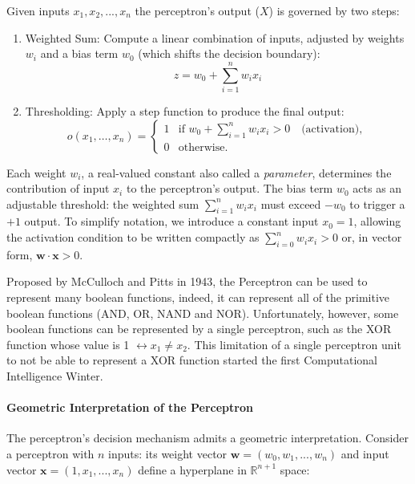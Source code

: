 \documentclass{tufte-handout}
\begin{document}
Given inputs $x_1, x_2, ..., x_n$ the perceptron's output ($X$) is governed by two steps:
\begin{enumerate}
    \item Weighted Sum: Compute a linear combination of inputs, adjusted by weights $w_i$ and a bias term $w_0$ (which shifts the decision boundary):
    \begin{equation}
        z = w_0 + \sum_{i=1}^{n}w_ix_i
    \end{equation}
    \item Thresholding:  Apply a step function to produce the final output:
    \begin{equation} \label{perceptron}
o(x_1, \dots, x_n) =
\begin{cases}
1 & \text{if } w_0 + \sum_{i=1}^n w_i x_i > 0 \quad \text{(activation)}, \\ 0 & \text{otherwise.}
\end{cases}
\end{equation}
\end{enumerate}

Each weight \( w_i \), a real-valued constant also called a \textit{parameter}, determines the contribution of input \( x_i \) to the perceptron's output. The bias term \( w_0 \) acts as an adjustable threshold: the weighted sum \( \sum_{i=1}^n w_i x_i \) must exceed \( -w_0 \) to trigger a \( +1 \) output. To simplify notation, we introduce a constant input \( x_0 = 1 \), allowing the activation condition to be written compactly as \( \sum_{i=0}^n w_i x_i > 0 \) or, in vector form, \( \mathbf{w} \cdot \mathbf{x} > 0 \).

Proposed by McCulloch and Pitts in 1943, the Perceptron can be used to represent many boolean functions, indeed, it can represent all of the primitive boolean functions (AND, OR, NAND and NOR). Unfortunately, however, some boolean functions can be represented by a single perceptron, such as the XOR function whose value is 1 $\leftrightarrow x_1 \neq x_2$. This limitation of a single perceptron unit to not be able to represent a XOR function started the first Computational Intelligence Winter.


\paragraph{Geometric Interpretation of the Perceptron}

The perceptron's decision mechanism admits a geometric interpretation. Consider a perceptron with $n$ inputs: its weight vector $\mathbf{w} = (w_0, w_1, ..., w_n)$ and input vector $\mathbf{x} = (1, x_1, ..., x_n)$ define a hyperplane in $\mathbb{R}^{n+1}$ space:
\end{document}
